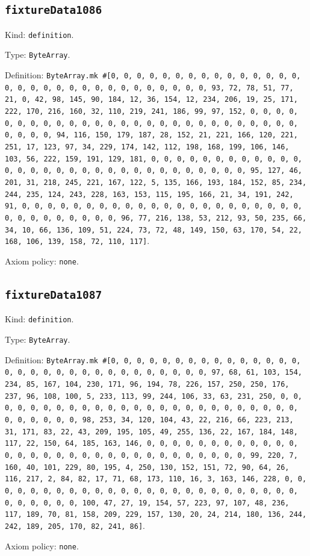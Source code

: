 \documentclass[11pt]{article}
\begin{document}
\subsection*{\texttt{fixtureData1086}}
\noindent Kind: \texttt{definition}.\par
\noindent Type: \texttt{ByteArray}.\par
\noindent Definition: \texttt{ByteArray.mk \#[0, 0, 0, 0, 0, 0, 0, 0, 0, 0, 0, 0, 0, 0, 0, 0, 0, 0, 0, 0, 0, 0, 0, 0, 0, 0, 0, 0, 0, 0, 0, 93, 72, 78, 51, 77, 21, 0, 42, 98, 145, 90, 184, 12, 36, 154, 12, 234, 206, 19, 25, 171, 222, 170, 216, 160, 32, 110, 219, 241, 186, 99, 97, 152, 0, 0, 0, 0, 0, 0, 0, 0, 0, 0, 0, 0, 0, 0, 0, 0, 0, 0, 0, 0, 0, 0, 0, 0, 0, 0, 0, 0, 0, 0, 0, 94, 116, 150, 179, 187, 28, 152, 21, 221, 166, 120, 221, 251, 17, 123, 97, 34, 229, 174, 142, 112, 198, 168, 199, 106, 146, 103, 56, 222, 159, 191, 129, 181, 0, 0, 0, 0, 0, 0, 0, 0, 0, 0, 0, 0, 0, 0, 0, 0, 0, 0, 0, 0, 0, 0, 0, 0, 0, 0, 0, 0, 0, 0, 0, 95, 127, 46, 201, 31, 218, 245, 221, 167, 122, 5, 135, 166, 193, 184, 152, 85, 234, 244, 235, 124, 243, 228, 163, 153, 115, 195, 166, 21, 34, 191, 242, 91, 0, 0, 0, 0, 0, 0, 0, 0, 0, 0, 0, 0, 0, 0, 0, 0, 0, 0, 0, 0, 0, 0, 0, 0, 0, 0, 0, 0, 0, 0, 0, 96, 77, 216, 138, 53, 212, 93, 50, 235, 66, 34, 10, 66, 136, 109, 51, 224, 73, 72, 48, 149, 150, 63, 170, 54, 22, 168, 106, 139, 158, 72, 110, 117]}.\par
\noindent Axiom policy: \texttt{none}.\par
\subsection*{\texttt{fixtureData1087}}
\noindent Kind: \texttt{definition}.\par
\noindent Type: \texttt{ByteArray}.\par
\noindent Definition: \texttt{ByteArray.mk \#[0, 0, 0, 0, 0, 0, 0, 0, 0, 0, 0, 0, 0, 0, 0, 0, 0, 0, 0, 0, 0, 0, 0, 0, 0, 0, 0, 0, 0, 0, 0, 97, 68, 61, 103, 154, 234, 85, 167, 104, 230, 171, 96, 194, 78, 226, 157, 250, 250, 176, 237, 96, 108, 100, 5, 233, 113, 99, 244, 106, 33, 63, 231, 250, 0, 0, 0, 0, 0, 0, 0, 0, 0, 0, 0, 0, 0, 0, 0, 0, 0, 0, 0, 0, 0, 0, 0, 0, 0, 0, 0, 0, 0, 0, 0, 98, 253, 34, 120, 104, 43, 22, 216, 66, 223, 213, 31, 171, 83, 22, 43, 209, 195, 105, 49, 255, 136, 22, 167, 184, 148, 117, 22, 150, 64, 185, 163, 146, 0, 0, 0, 0, 0, 0, 0, 0, 0, 0, 0, 0, 0, 0, 0, 0, 0, 0, 0, 0, 0, 0, 0, 0, 0, 0, 0, 0, 0, 0, 0, 99, 220, 7, 160, 40, 101, 229, 80, 195, 4, 250, 130, 152, 151, 72, 90, 64, 26, 116, 217, 2, 84, 82, 17, 71, 68, 173, 110, 16, 3, 163, 146, 228, 0, 0, 0, 0, 0, 0, 0, 0, 0, 0, 0, 0, 0, 0, 0, 0, 0, 0, 0, 0, 0, 0, 0, 0, 0, 0, 0, 0, 0, 0, 0, 100, 47, 27, 19, 154, 57, 223, 97, 107, 48, 236, 117, 189, 70, 81, 158, 209, 229, 157, 130, 20, 24, 214, 180, 136, 244, 242, 189, 205, 170, 82, 241, 86]}.\par
\noindent Axiom policy: \texttt{none}.\par
\end{document}
